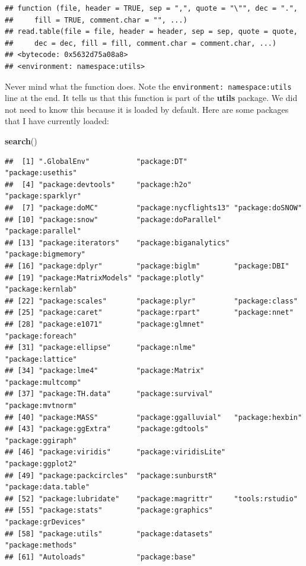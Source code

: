 \documentclass[]{book}
\newenvironment{Shaded}{\begin{snugshade}}{\end{snugshade}}
\newcommand{\KeywordTok}[1]{\textcolor[rgb]{0.13,0.29,0.53}{\textbf{#1}}}
\newcommand{\NormalTok}[1]{#1}
\theoremstyle{definition}
\theoremstyle{definition}
\theoremstyle{definition}
\theoremstyle{remark}
\begin{document}
\begin{verbatim}
## function (file, header = TRUE, sep = ",", quote = "\"", dec = ".", 
##     fill = TRUE, comment.char = "", ...) 
## read.table(file = file, header = header, sep = sep, quote = quote, 
##     dec = dec, fill = fill, comment.char = comment.char, ...)
## <bytecode: 0x5632d75a08a8>
## <environment: namespace:utils>
\end{verbatim}

Never mind what the function does.
Note the \texttt{environment:\ namespace:utils} line at the end.
It tells us that this function is part of the \textbf{utils} package.
We did not need to know this because it is loaded by default.
Here are some packages that I have currently loaded:

\begin{Shaded}
\begin{Highlighting}[]
\KeywordTok{search}\NormalTok{()}
\end{Highlighting}
\end{Shaded}

\begin{verbatim}
##  [1] ".GlobalEnv"           "package:DT"           "package:usethis"     
##  [4] "package:devtools"     "package:h2o"          "package:sparklyr"    
##  [7] "package:doMC"         "package:nycflights13" "package:doSNOW"      
## [10] "package:snow"         "package:doParallel"   "package:parallel"    
## [13] "package:iterators"    "package:biganalytics" "package:bigmemory"   
## [16] "package:dplyr"        "package:biglm"        "package:DBI"         
## [19] "package:MatrixModels" "package:plotly"       "package:kernlab"     
## [22] "package:scales"       "package:plyr"         "package:class"       
## [25] "package:caret"        "package:rpart"        "package:nnet"        
## [28] "package:e1071"        "package:glmnet"       "package:foreach"     
## [31] "package:ellipse"      "package:nlme"         "package:lattice"     
## [34] "package:lme4"         "package:Matrix"       "package:multcomp"    
## [37] "package:TH.data"      "package:survival"     "package:mvtnorm"     
## [40] "package:MASS"         "package:ggalluvial"   "package:hexbin"      
## [43] "package:ggExtra"      "package:gdtools"      "package:ggiraph"     
## [46] "package:viridis"      "package:viridisLite"  "package:ggplot2"     
## [49] "package:packcircles"  "package:sunburstR"    "package:data.table"  
## [52] "package:lubridate"    "package:magrittr"     "tools:rstudio"       
## [55] "package:stats"        "package:graphics"     "package:grDevices"   
## [58] "package:utils"        "package:datasets"     "package:methods"     
## [61] "Autoloads"            "package:base"
\end{verbatim}
\end{document}
